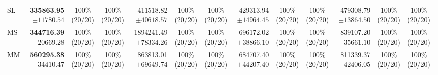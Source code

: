 \begin{table}[!t]
\begin{tabular}{@{}l*{4}{rcc}@{}}
SL & \shortstack[r]{\textbf{335863.95}\\$\pm 11780.54$} & \shortstack[c]{100\%\\(20/20)} & \shortstack[c]{100\%\\(20/20)} & \shortstack[r]{411518.82\\$\pm 40618.57$} & \shortstack[c]{100\%\\(20/20)} & \shortstack[c]{100\%\\(20/20)} & \shortstack[r]{429313.94\\$\pm 14964.45$} & \shortstack[c]{100\%\\(20/20)} & \shortstack[c]{100\%\\(20/20)} & \shortstack[r]{479308.79\\$\pm 13864.50$} & \shortstack[c]{100\%\\(20/20)} & \shortstack[c]{100\%\\(20/20)} \\
MS & \shortstack[r]{\textbf{344716.39}\\$\pm 20669.28$} & \shortstack[c]{100\%\\(20/20)} & \shortstack[c]{100\%\\(20/20)} & \shortstack[r]{1894241.49\\$\pm 78334.26$} & \shortstack[c]{100\%\\(20/20)} & \shortstack[c]{100\%\\(20/20)} & \shortstack[r]{696172.02\\$\pm 38866.10$} & \shortstack[c]{100\%\\(20/20)} & \shortstack[c]{100\%\\(20/20)} & \shortstack[r]{839107.20\\$\pm 35661.10$} & \shortstack[c]{100\%\\(20/20)} & \shortstack[c]{100\%\\(20/20)} \\
MM & \shortstack[r]{\textbf{560295.38}\\$\pm 34410.47$} & \shortstack[c]{100\%\\(20/20)} & \shortstack[c]{100\%\\(20/20)} & \shortstack[r]{863813.01\\$\pm 69649.74$} & \shortstack[c]{100\%\\(20/20)} & \shortstack[c]{100\%\\(20/20)} & \shortstack[r]{684707.40\\$\pm 44207.40$} & \shortstack[c]{100\%\\(20/20)} & \shortstack[c]{100\%\\(20/20)} & \shortstack[r]{811339.37\\$\pm 42406.05$} & \shortstack[c]{100\%\\(20/20)} & \shortstack[c]{100\%\\(20/20)} \\

\end{tabular}
\end{table}
